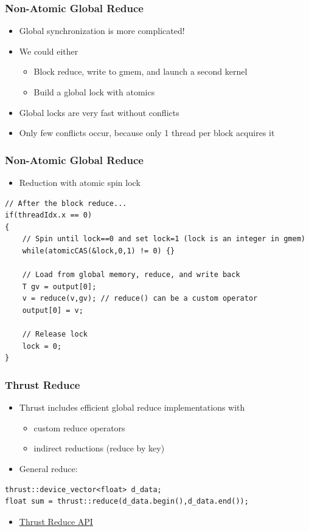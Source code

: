 \documentclass[aspectratio=169,handout]{beamer}
\begin{document}
\begin{frame}[fragile]
\frametitle{Non-Atomic Global Reduce}
\begin{itemize}
	\item Global synchronization is more complicated!
	\item<2-> We could either
	\begin{itemize}
		\item Block reduce, write to gmem, and launch a second kernel
		\item Build a global lock with atomics
	\end{itemize}
	\item<3->[$\rightarrow$] Global locks are very fast without conflicts
	\item<4->[$\rightarrow$] Only few conflicts occur, because only 1 thread per block acquires it
\end{itemize}

\end{frame}


\begin{frame}[fragile]
\frametitle{Non-Atomic Global Reduce}
\label{si:spinlock}
\begin{itemize}
	\item Reduction with atomic spin lock
\end{itemize}
\begin{lstlisting}
// After the block reduce...
if(threadIdx.x == 0)
{
	// Spin until lock==0 and set lock=1 (lock is an integer in gmem)
	while(atomicCAS(&lock,0,1) != 0) {}
	
	// Load from global memory, reduce, and write back
	T gv = output[0];
	v = reduce(v,gv); // reduce() can be a custom operator
	output[0] = v;
	
	// Release lock
	lock = 0;
}
\end{lstlisting}
\end{frame}


\begin{frame}[fragile]
\frametitle{Thrust Reduce}
\begin{itemize}
	\item Thrust includes efficient global reduce implementations with
	\begin{itemize}
		\item custom reduce operators
		\item indirect reductions (reduce by key)
	\end{itemize}
	\item General reduce:
\end{itemize}
\begin{lstlisting}
thrust::device_vector<float> d_data;
float sum = thrust::reduce(d_data.begin(),d_data.end());
\end{lstlisting}
\begin{itemize}
	\item \href{https://thrust.github.io/doc/group__reductions.html}{Thrust Reduce API}
	
\end{itemize}
\end{frame}
\end{document}
